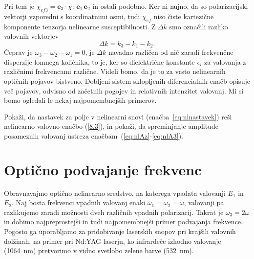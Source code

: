 \documentclass[11pt,fleqn]{book} %
\newcommand{\beq}{\begin{equation}}
\newcommand{\eeq}{\end{equation}}
\begin{document}
Pri tem je $\chi_{ef3}=\mathbf{e}_{3}\cdot\chi:\,\mathbf{e}_{1}\,\mathbf{e}_{2}$ in ostali podobno.
Ker ni nujno, da so polarizacijski vektorji vzporedni s koordinatnimi osmi, tudi $\chi_{ef}$ 
niso čiste kartezične komponente tenzorja nelinearne susceptibilnosti. 
Z $\Delta k$ smo označili razliko valovnih vektorjev
\beq
\Delta k = k_{3}-k_{1}-k_{2}.
\eeq
Čeprav je $\omega_{3}-\omega_{2}-\omega_{1}=0$, je $\Delta k$ navadno različen od nič zaradi 
frekvenčne disperzije lomnega količnika, to je, ker so dielektrične konstante $\epsilon_{i}$
za valovanja z različnimi frekvencami različne. Videli bomo, da je to za vrsto nelinearnih optičnih pojavov
bistveno. Dobljeni sistem sklopljenih diferencialnih enačb opisuje več pojavov, 
odvisno od začetnih pogojev in relativnih intenzitet valovanj. Mi si bomo ogledali le nekaj
najpomembnejših primerov.
\begin{definition}
Pokaži, da nastavek za polje v nelinearni snovi (enačba~\ref{eq:nlnastavek}) reši nelinearno
valovno enačbo (\ref{8.3}), in pokaži, da spreminjanje amplitude posameznih valovanj 
ustreza enačbam~(\ref{eq:nlAz}-\ref{eq:nlA3}).
\end{definition}

\section{Optično podvajanje frekvenc}
Obravnavajmo optično nelinearno sredstvo, na katerega vpadata valovanji $E_1$ in $E_2$.
Naj bosta frekvenci vpadnih valovanj enaki $\omega_{1}=\omega_{2}=\omega$, valovanji
pa razlikujemo zaradi možnosti dveh različnih vpadnih polarizacij. Takrat je $\omega_{3}=2\omega$
in dobimo najpreprostejši in tudi najpomembnejši primer podvajanja frekvence. 
Pogosto ga uporabljamo za pridobivanje laserskih snopov pri krajših valovnih dolžinah, na primer
pri Nd:YAG laserju, ko infrardeče izhodno valovanje (1064~nm) 
pretvorimo v vidno svetlobo zelene barve (532~nm). 
\end{document}
